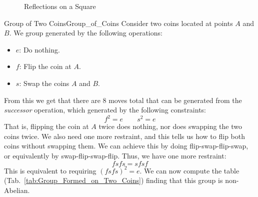     \begin{figure}[H]
        \centering
        \captionsetup{type=figure}
        \caption{Reflections on a Square}
        \label{fig:Group_Reflections_on_a_Square}
    \end{figure}
    \begin{lexample}{Group of Two Coins}{Group_of_Coins}
        Consider two coins located at points $A$ and $B$. We group generated by
        the following operations:
        \begin{itemize}
            \item $e$: Do nothing.
            \item $f$: Flip the coin at $A$.
            \item $s$: Swap the coins $A$ and $B$.
        \end{itemize}
        From this we get that there are 8 moves total that can be generated from
        the \textit{successor} operation, which generated by the following
        constraints:
        \begin{equation}
            f^{2}=e
            \quad\quad
            s^{2}=e
        \end{equation}
        That is, flipping the coin at $A$ twice does nothing, nor does swapping
        the two coins twice. We also need one more restraint, and this tells us
        how to flip both coins without swapping them. We can achieve this by
        doing flip-swap-flip-swap, or equivalently by swap-flip-swap-flip. Thus,
        we have one more restraint:
        \begin{equation}
            fsfs=sfsf
        \end{equation}
        This is equivalent to requiring $(fsfs)^{2}=e$. We can now compute the
        table (Tab.~\ref{tab:Group_Formed_on_Two_Coins}) finding that this group
        is non-Abelian.
    \end{lexample}
